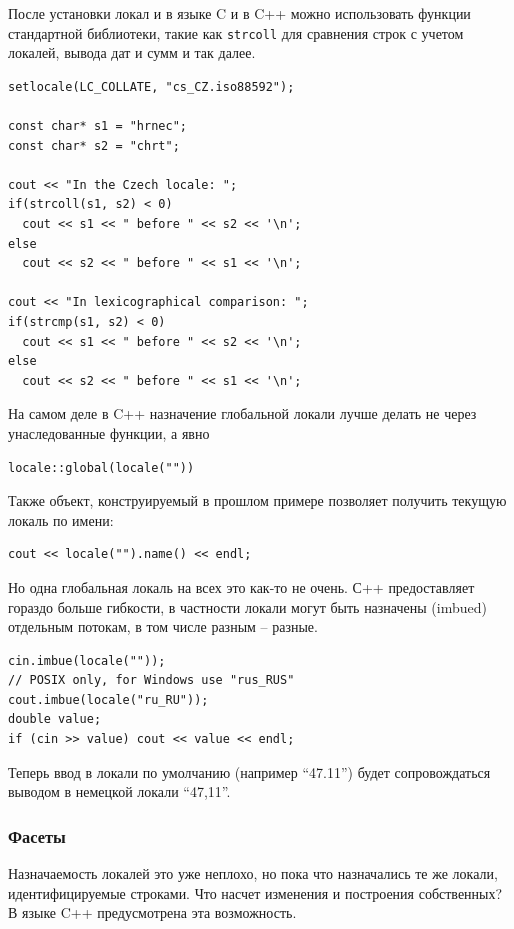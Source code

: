 \documentclass[a4paper,12pt,oneside]{article}
\begin{document}
После установки локал
и в языке C и в C++ можно использовать функции стандартной библиотеки, такие как \lstinline!strcoll! для сравнения строк с учетом локалей, вывода дат и сумм и так далее.

\begin{lstlisting}
setlocale(LC_COLLATE, "cs_CZ.iso88592");
 
const char* s1 = "hrnec";
const char* s2 = "chrt";
 
cout << "In the Czech locale: ";
if(strcoll(s1, s2) < 0)
  cout << s1 << " before " << s2 << '\n';
else
  cout << s2 << " before " << s1 << '\n';

cout << "In lexicographical comparison: ";
if(strcmp(s1, s2) < 0)
  cout << s1 << " before " << s2 << '\n';
else
  cout << s2 << " before " << s1 << '\n';
\end{lstlisting}

На самом деле в C++ назначение глобальной локали лучше делать не через унаследованные функции, а явно

\begin{lstlisting}
locale::global(locale(""))
\end{lstlisting}

Также объект, конструируемый в прошлом примере позволяет получить текущую локаль по имени:

\begin{lstlisting}
cout << locale("").name() << endl;
\end{lstlisting}

Но одна глобальная локаль на всех это как-то не очень. С++ предоставляет гораздо больше гибкости, в частности локали могут быть назначены (imbued) отдельным потокам, в том числе разным -- разные.

\begin{lstlisting}
cin.imbue(locale(""));
// POSIX only, for Windows use "rus_RUS"
cout.imbue(locale("ru_RU")); 
double value;
if (cin >> value) cout << value << endl;
\end{lstlisting}

Теперь ввод в локали по умолчанию (например ``47.11'') будет сопровождаться выводом в немецкой локали ``47,11''.

\subsubsection{Фасеты}\label{subsubsec:facets}

Назначаемость локалей это уже неплохо, но пока что назначались те же локали, идентифицируемые строками. Что насчет изменения и построения собственных? В языке C++ предусмотрена эта возможность.
\end{document}
